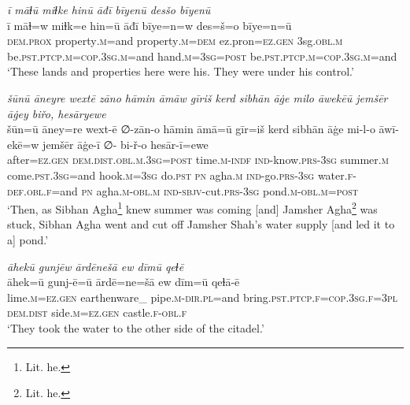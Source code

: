 \ea \label{DP.28}
\textit{ī māɫū miɫke hinū āđī bīyenū desšo bīyenū} \\ 
\gll ī māɫ=w miɫk=e hin=ū āđī bīye=n=w des=š=o bīye=n=ū \\ 
 \textsc{dem.prox} property\textsc{.m}=and property\textsc{.m}\textsc{=dem} ez.pron\textsc{=ez}\textsc{.gen} 3sg\textsc{.obl}\textsc{.m} be\textsc{.pst}\textsc{.ptcp}\textsc{.m}\textsc{=cop}\textsc{.3sg}\textsc{.m}=and hand\textsc{.m}\textsc{=3sg}\textsc{=\textsc{post}} be\textsc{.pst}\textsc{.ptcp}\textsc{.m}\textsc{=cop}\textsc{.3sg}\textsc{.m}=and \\ 
\glt `These lands and properties here were his. They were under his control.'
\z 
 
\ea \label{DP.30}
\textit{šūnū āneyre wextē zāno hāmin āmāw gīriš kerd sibhān āġe milo āwekēū jemšēr āġey biřo, hesāryewe} \\ 
\gll šūn=ū āney=re wext-ē ∅-zān-o hāmin āmā=ū gīr=iš kerd sibhān āġe mi-l-o āwī-ekē=w jemšēr āġe-ī ∅- bi-ř-o hesār-ī=ewe \\ 
 after\textsc{=ez}\textsc{.gen} \textsc{dem.dist}\textsc{.obl}\textsc{.m}\textsc{.3sg}\textsc{=\textsc{post}} time\textsc{.m}\textsc{-indf} \textsc{ind-}know\textsc{.prs}\textsc{-3sg} summer\textsc{.m} come\textsc{.pst}\textsc{.3sg}=and hook\textsc{.m}\textsc{=3sg} do\textsc{.pst} \textsc{pn} agha\textsc{.m} \textsc{ind-}go\textsc{.prs}\textsc{-3sg} water\textsc{\textsc{.f}}\textsc{-def}\textsc{.obl}\textsc{\textsc{.f}}=and \textsc{pn} agha\textsc{.m}\textsc{-obl}\textsc{.m} \textsc{ind-}\textsc{sbjv-}cut\textsc{.prs}\textsc{-3sg} pond\textsc{.m}\textsc{-obl}\textsc{.m}\textsc{=\textsc{post}} \\ 
\glt `Then, as Sibhan Agha\footnote{Lit. he.} knew summer was coming [and] Jamsher Agha\footnote{Lit. he.} was stuck, Sibhan Agha went and cut off Jamsher Shah’s water supply [and led it to a] pond.'
\z 
 
\ea \label{DP.32}
\textit{āhekū gunjēw ārdēnešā ew dīmū qeɫē} \\ 
\gll āhek=ū gunj-ē=ū ārdē=ne=šā ew dīm=ū qeɫā-ē \\ 
 lime\textsc{.m}\textsc{=ez}\textsc{.gen} earthenware\_ pipe\textsc{.m}\textsc{-dir}\textsc{.pl}=and bring\textsc{.pst}\textsc{.ptcp}\textsc{\textsc{.f}}\textsc{=cop}\textsc{.3sg}\textsc{\textsc{.f}}\textsc{=3pl} \textsc{dem.dist} side\textsc{.m}\textsc{=ez}\textsc{.gen} castle\textsc{\textsc{.f}}\textsc{-obl}\textsc{\textsc{.f}} \\ 
\glt `They took the water to the other side of the citadel.'
\z 
 
